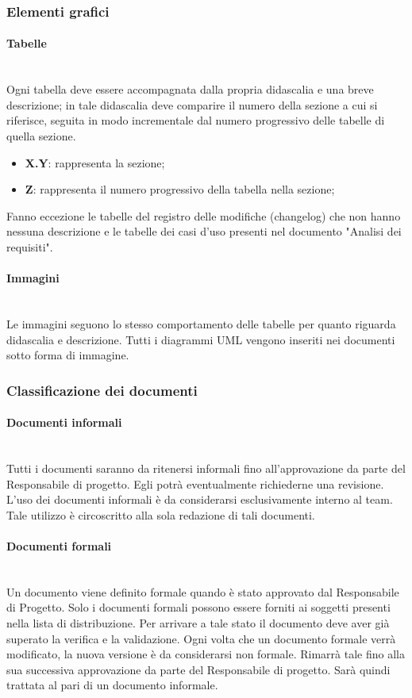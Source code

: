 		\subsubsection{Elementi grafici}
		\paragraph{Tabelle} \mbox{}\\
		Ogni tabella deve essere accompagnata dalla propria didascalia e una breve descrizione; in tale didascalia deve comparire il numero della sezione a cui si riferisce, seguita in modo incrementale dal numero progressivo delle tabelle di quella sezione.
		\begin{itemize}
			\item \textbf{{X.Y}}: rappresenta la sezione;
			\item \textbf{{Z}}: rappresenta il numero progressivo della tabella nella sezione;
		\end{itemize}
		Fanno eccezione le tabelle del registro delle modifiche (changelog) che non hanno nessuna descrizione e le tabelle dei casi d’uso presenti nel documento
		"Analisi dei requisiti".
		\paragraph{Immagini} \mbox{}\\
		Le immagini seguono lo stesso comportamento delle tabelle per quanto riguarda didascalia e descrizione. Tutti i diagrammi UML vengono inseriti nei documenti sotto forma di immagine.
		\subsubsection{Classificazione dei documenti}
		\paragraph{Documenti informali} \mbox{}\\
		Tutti i documenti saranno da ritenersi informali fino all’approvazione da parte del Responsabile di progetto. Egli potrà eventualmente richiederne una revisione. L’uso dei documenti informali è da considerarsi esclusivamente interno al team. Tale utilizzo è circoscritto alla sola redazione di tali documenti.
		\paragraph{Documenti formali} \mbox{}\\
		Un documento viene definito formale quando è stato approvato dal	Responsabile di Progetto. Solo i documenti formali possono essere forniti ai soggetti presenti nella lista di distribuzione. Per arrivare a tale stato il documento deve aver già superato la verifica e la validazione.
		Ogni volta che un documento formale verrà modificato, la nuova
		versione è da considerarsi non formale. Rimarrà tale fino alla sua successiva approvazione da parte del Responsabile di progetto. Sarà quindi trattata al pari di un documento informale.
